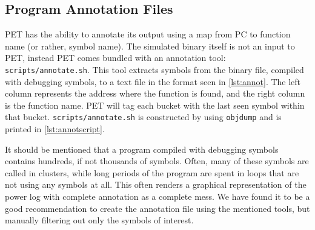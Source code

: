 \subsection{Program Annotation Files}
\label{subsec:annot}

PET has the ability to annotate its output using a map from PC to function name
(or rather, symbol name). The simulated binary itself is not an input to PET,
instead PET comes bundled with an annotation tool: \texttt{scripts/annotate.sh}.
This tool extracts symbols from the binary file, compiled with debugging
symbols, to a text file in the format seen in \autoref{lst:annot}. The left
column represents the address where the function is found, and the right
column is the function name. PET will tag each bucket with the last seen
symbol within that bucket. \texttt{scripts/annotate.sh} is constructed by using
\texttt{objdump} and is printed in \autoref{lst:annotscript}.




It should be mentioned that a program compiled with debugging symbols contains
hundreds, if not thousands of symbols. Often, many of these symbols are called
in clusters, while long periods of the program are spent in loops that are not
using any symbols at all. This often renders a graphical representation of the
power log with complete annotation as a complete mess. We have found it to be a
good recommendation to create the annotation file using the mentioned tools, but
manually filtering out only the symbols of interest.

